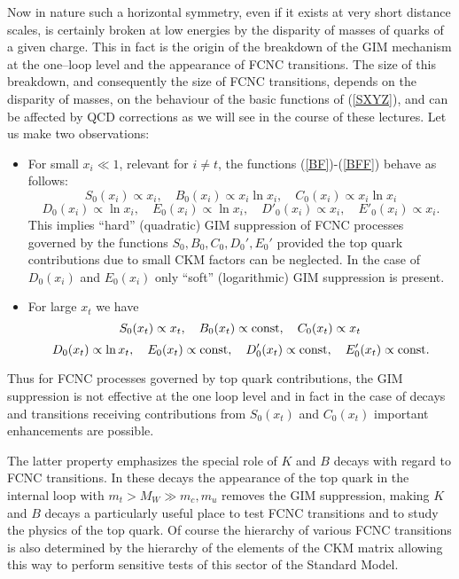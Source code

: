 \documentclass[12pt]{article}
\begin{document}
\begin{itemize}
\noindent
Now in nature such a horizontal symmetry, even if it exists
at very short distance scales, is certainly broken at low energies by
the disparity of masses of quarks of a given charge. This in fact is
the origin of the breakdown of the GIM mechanism at the one--loop
level and the appearance of FCNC transitions. 
The size of this breakdown, and consequently the size of 
FCNC transitions, depends on the disparity of masses,
on the behaviour of the basic functions of (\ref{SXYZ}), and can be
affected by QCD corrections as we will see in the course of these
lectures. Let us make two
observations: 
\begin{itemize}
\item
For small $x_i\ll 1$, relevant for $i\not= t$, 
the functions (\ref{BF})-(\ref{BFF})
behave as follows:
\begin{equation}
S_0(x_i)\propto x_i, \quad 
  B_0(x_i)\propto x_i \ln x_i, \quad
  C_0(x_i)\propto x_i \ln x_i 
\end{equation}
\begin{equation}
D_0(x_i)\propto \ln x_i, \quad
  E_0(x_i)\propto \ln x_i,  \quad
  D'_0(x_i)\propto x_i, \quad 
  E'_0(x_i)\propto x_i. 
\end{equation}
This implies ``hard'' (quadratic) GIM suppression of FCNC processes 
governed by the
functions $S_0,B_0,C_0,D_0',E_0'$ provided the top quark contributions due 
to small CKM
factors can be neglected. In the case of $D_0(x_i)$ and 
$E_0(x_i)$ only ``soft''
(logarithmic) GIM suppression is present.
\par
\item
For large $x_t$ we have
\begin{equation}
S_0(x_t)\propto x_t, \quad 
  B_0(x_t)\propto {\rm const}, \quad
  C_0(x_t)\propto x_t
\end{equation}
\begin{equation}
D_0(x_t)\propto \ln x_t, \quad
  E_0(x_t)\propto {\rm const},  \quad
  D'_0(x_t)\propto {\rm const}, \quad 
  E'_0(x_t)\propto {\rm const}. 
\end{equation}
\end{itemize}
Thus for FCNC processes governed by top quark contributions, 
the GIM suppression is
not effective at the one loop level and in fact in the case of decays and
transitions receiving contributions from $S_0(x_t)$ and $C_0(x_t)$  
important
enhancements are possible. 
\par

The latter property emphasizes the special role of $K$ and $B$ decays with
regard to FCNC transitions. In these decays the appearance of the
top quark in the internal loop with $m_t>M_W\gg m_c,m_u$ removes the
GIM suppression, making $K$ and $B$ decays a particularly
useful place to test FCNC transitions and to study the physics of
the top quark. Of course the hierarchy of various FCNC transitions is also
determined by the hierarchy of the elements of the CKM matrix allowing
this way to perform sensitive tests of this sector of the Standard
Model. 


\end{itemize}
\end{document}

